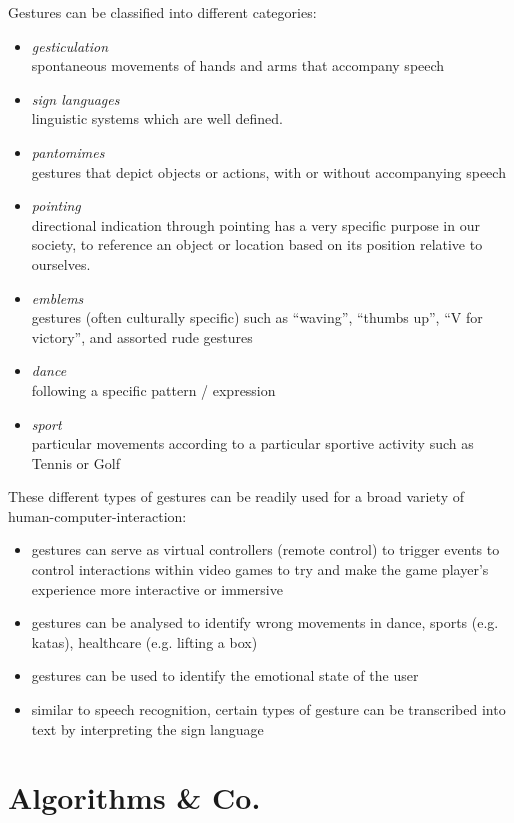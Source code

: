 \documentclass[titlepage,12pt,a4paper]{article}
\begin{document}
Gestures can be classified into different categories:
\begin{itemize}
	\item \emph{gesticulation}\\ spontaneous movements of hands and arms that accompany speech
	\item \emph{sign languages}\\ linguistic systems which are well defined.
	\item \emph{pantomimes}\\ gestures that depict objects or actions, with or without accompanying speech
	\item \emph{pointing}\\ directional indication through pointing has a very specific purpose in our society, to reference an object or location based on its position relative to ourselves. 
	\item \emph{emblems}\\ gestures (often culturally specific) such as “waving”, “thumbs up”, “V for victory”, and assorted rude gestures 
	\item \emph{dance}\\ following a specific pattern / expression
	\item \emph{sport}\\ particular movements according to a particular sportive activity such as Tennis or Golf
\end{itemize}

These different types of gestures can be readily used for a broad variety of human-computer-interaction:
\begin{itemize}
	\item gestures can serve as virtual controllers (remote control) to trigger events to control interactions within video games to try and make the game player's experience more interactive or immersive
	\item gestures can be analysed to identify wrong movements in dance, sports (e.g. katas), healthcare (e.g. lifting a box)  
	\item gestures can be used to identify the emotional state of the user
	\item similar to speech recognition, certain types of gesture can be transcribed into text by interpreting the sign language
\end{itemize}

\newpage

\section{Algorithms \& Co.}
\end{document}
